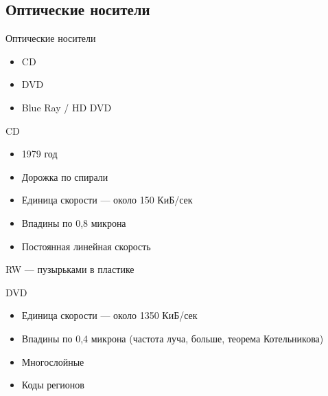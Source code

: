 \documentclass[xetex,aspectratio=43]{beamer}
\begin{document}
\subsection{Оптические носители}

\begin{frame}{Оптические носители}
\begin{itemize}
\tightlist
\item
  CD
\item
  DVD
\item
  Blue Ray / HD DVD
\end{itemize}
\end{frame}

\begin{frame}
    \begin{block}{CD}
        \begin{itemize}
            \tightlist
            \item
            1979 год
            \item
            Дорожка по спирали
            \item
            Единица скорости --- около 150 КиБ/сек
            \item
            Впадины по 0,8 микрона
            \item
            Постоянная линейная скорость
        \end{itemize}

        RW --- пузырьками в пластике
    \end{block}
\end{frame}

\begin{frame}
    \begin{block}{DVD}
        \begin{itemize}
            \tightlist
            \item
            Единица скорости --- около 1350 КиБ/сек
            \item
            Впадины по 0,4 микрона (частота луча, больше, теорема Котельникова)
            \item
            Многослойные
            \item
            Коды регионов
        \end{itemize}
    \end{block}
\end{frame}
\end{document}
